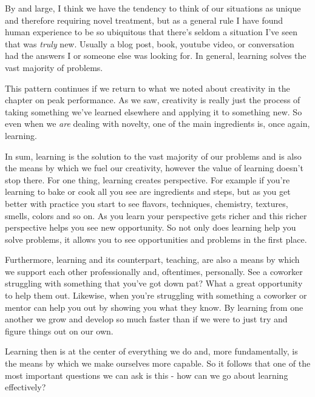 \documentclass[11pt,a5paper]{book}
\begin{document}
By and large, I think we have the tendency to think of our situations as unique and therefore requiring novel treatment, but as a general rule I have found human experience to be so ubiquitous that there's seldom a situation I've seen that was \textit{truly} new. Usually a blog post, book, youtube video, or conversation had the answers I or someone else was looking for. In general, learning solves the vast majority of problems.
\newline

This pattern continues if we return to what we noted about creativity in the chapter on peak performance. As we saw, creativity is really just the process of taking something we've learned elsewhere and applying it to something new. So even when we \textit{are} dealing with novelty, one of the main ingredients is, once again, learning.  
\newline

In sum, learning is the solution to the vast majority of our problems and is also the means by which we fuel our creativity, however the value of learning doesn't stop there. For one thing, learning creates perspective. For example if you're learning to bake or cook all you see are ingredients and steps, but as you get better with practice you start to see flavors, techniques, chemistry, textures, smells, colors and so on. As you learn your perspective gets richer and this richer perspective helps you see new opportunity. So not only does learning help you solve problems, it allows you to see opportunities and problems in the first place.
\newline

Furthermore, learning and its counterpart, teaching, are also a means by which we support each other professionally and, oftentimes, personally. See a coworker struggling with something that you've got down pat? What a great opportunity to help them out. Likewise, when you're struggling with something a coworker or mentor can help you out by showing you what they know. By learning from one another we grow and develop so much faster than if we were to just try and figure things out on our own.
\newline

Learning then is at the center of everything we do and, more fundamentally, is the means by which we make ourselves more capable. So it follows that one of the most important questions we can ask is this - how can we go about learning effectively? 
\end{document}

